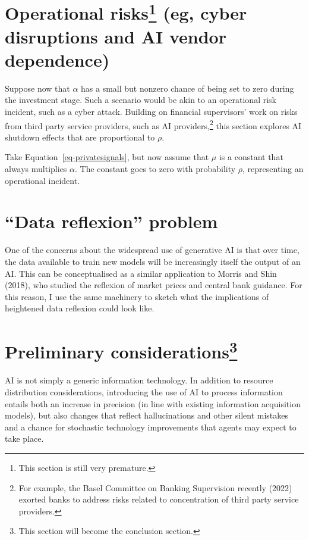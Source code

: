 \documentclass[
]{article}
\theoremstyle{plain}
\theoremstyle{definition}
\theoremstyle{remark}
\begin{document}
\section[Operational risks (eg, cyber disruptions and AI vendor
dependence)]{\texorpdfstring{Operational risks\footnote{This section is
  still very premature.} (eg, cyber disruptions and AI vendor
dependence)}{Operational risks (eg, cyber disruptions and AI vendor dependence)}}\label{operational-riskswipoprisk-eg-cyber-disruptions-and-ai-vendor-dependence}

Suppose now that \(\alpha\) has a small but nonzero chance of being set
to zero during the investment stage. Such a scenario would be akin to an
operational risk incident, such as a cyber attack. Building on financial
supervisors' work on risks from third party service providers, such as
AI providers,\footnote{For example, the Basel Committee on Banking
  Supervision recently (2022) exorted banks to address risks related to
  concentration of third party service providers.} this section explores
AI shutdown effects that are proportional to \(\rho\).

Take Equation~\ref{eq-privatesignals}, but now assume that \(\mu\) is a
constant that always multiplies \(\alpha\). The constant goes to zero
with probability \(\rho\), representing an operational incident.

\section{``Data reflexion'' problem}\label{data-reflexion-problem}

One of the concerns about the widespread use of generative AI is that
over time, the data available to train new models will be increasingly
itself the output of an AI. This can be conceptualised as a similar
application to Morris and Shin (2018), who studied the reflexion of
market prices and central bank guidance. For this reason, I use the same
machinery to sketch what the implications of heightened data reflexion
could look like.

\section[Preliminary considerations]{\texorpdfstring{Preliminary
considerations\footnote{This section will become the conclusion section.}}{Preliminary considerations}}\label{preliminary-considerationsconcl}

AI is not simply a generic information technology. In addition to
resource distribution considerations, introducing the use of AI to
process information entails both an increase in precision (in line with
existing information acquisition models), but also changes that reflect
hallucinations and other silent mistakes and a chance for stochastic
technology improvements that agents may expect to take place.
\end{document}
